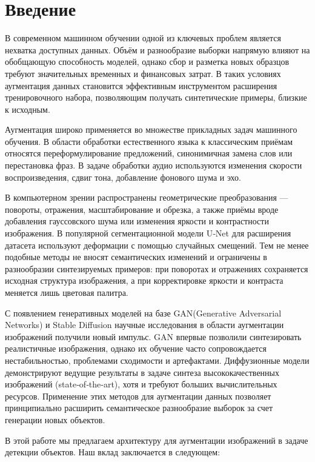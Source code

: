\section{Введение}

В современном машинном обучении одной из ключевых проблем является нехватка доступных данных. Объём и разнообразие выборки напрямую влияют на обобщающую способность моделей, однако сбор и разметка новых образцов требуют значительных временных и финансовых затрат. В таких условиях аугментация данных становится эффективным инструментом расширения тренировочного набора, позволяющим получать синтетические примеры, близкие к исходным.

Аугментация широко применяется во множестве прикладных задач машинного обучения. В области обработки естественного языка к классическим приёмам относятся переформулирование предложений, синонимичная замена слов или перестановка фраз. В задаче обработки аудио используются изменения скорости воспроизведения, сдвиг тона, добавление фонового шума и эхо. 

В компьютерном зрении распространены геометрические преобразования — повороты, отражения, масштабирование и обрезка, а также приёмы вроде добавления гауссовского шума или изменения яркости и контрастности изображения. В популярной сегментационной модели U‑Net\cite{DBLP:journals/corr/RonnebergerFB15} для расширения датасета используют деформации с помощью случайных смещений. Тем не менее подобные методы не вносят семантических изменений и ограничены в разнообразии синтезируемых примеров: при поворотах и отражениях сохраняется исходная структура изображения, а при корректировке яркости и контраста меняется лишь цветовая палитра.

С появлением генеративных моделей на базе GAN(Generative Adversarial Networks)\cite{goodfellow2014generativeadversarialnetworks} и Stable Diffusion\cite{DBLP:journals/corr/abs-2112-10752} научные исследования в области аугментации изображений получили новый импульс. GAN впервые позволили синтезировать реалистичные изображения, однако их обучение часто сопровождается нестабильностью, проблемами сходимости и артефактами. Диффузионные модели демонстрируют ведущие результаты в задаче синтеза высококачественных изображений (state‑of‑the‑art), хотя и требуют больших вычислительных ресурсов. Применение этих методов для аугментации данных позволяет принципиально расширить семантическое разнообразие выборок за счет генерации новых объектов.

В этой работе мы предлагаем архитектуру для аугментации изображений в задаче детекции объектов.
Наш вклад заключается в следующем:

